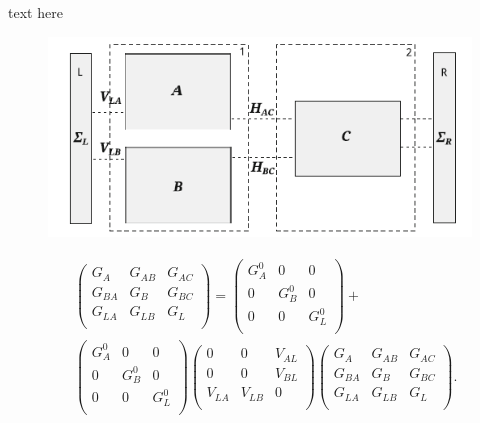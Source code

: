 \documentclass[handout,t]{beamer}
\begin{document}
\begin{frame}{text here}
	\begin{figure}
		\centering
		\includegraphics[width=0.7\linewidth]{../figures/multiconnectedgreen.png}
		\label{fig:multiconnectedgreen}
	\end{figure}
	\begin{equation}
		\begin{aligned}
			  & \left( \begin{matrix}
			   {{G}_{A}} & {{G}_{AB}} & {{G}_{AC}}  \\
			   {{G}_{BA}} & {{G}_{B}} & {{G}_{BC}}  \\
			   {{G}_{LA}} & {{G}_{LB}} & {{G}_{L}}  \\
			\end{matrix} \right)=\left( \begin{matrix}
			   G_{A}^{0} & 0 & 0  \\
			   0 & G_{B}^{0} & 0  \\
			   0 & 0 & G_{L}^{0}  \\
			\end{matrix} \right)+ \\ 
			 & \left( \begin{matrix}
			   G_{A}^{0} & 0 & 0  \\
			   0 & G_{B}^{0} & 0  \\
			   0 & 0 & G_{L}^{0}  \\
			\end{matrix} \right)\left( \begin{matrix}
			   0 & 0 & {{V}_{AL}}  \\
			   0 & 0 & {{V}_{BL}}  \\
			   {{V}_{LA}} & {{V}_{LB}} & 0  \\
			\end{matrix} \right)\left( \begin{matrix}
			   {{G}_{A}} & {{G}_{AB}} & {{G}_{AC}}  \\
			   {{G}_{BA}} & {{G}_{B}} & {{G}_{BC}}  \\
			   {{G}_{LA}} & {{G}_{LB}} & {{G}_{L}}  \\
			\end{matrix} \right). \\ 
		\end{aligned}
		\label{eq:expandmultigrren}
	\end{equation}
\end{frame}
\end{document}

